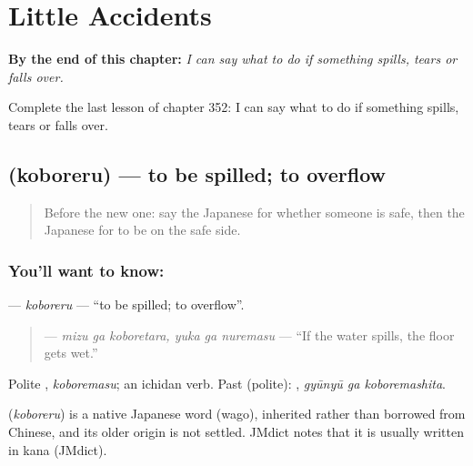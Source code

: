 
\chapter{Little Accidents}
\label{ch:ja-little-accidents}

\begin{chapteropening}
\textbf{By the end of this chapter:} \emph{I can say what to do if something spills, tears or falls over.}

Complete the last lesson of chapter 352: I can say what to do if something spills, tears or falls over.
\end{chapteropening}

\section[\texorpdfstring{\ja{こぼれる} (koboreru)}{こぼれる (koboreru)}]{ (koboreru) — to be spilled; to overflow}

\label{lesson:JA-C352-koboreru}



\begin{quote}
Before the new one: say the Japanese for whether someone is safe, then the Japanese for to be on the safe side.
\end{quote}

\subsection*{You'll want to know: }
\textbf{} — \emph{koboreru} — \textquotedblleft{}to be spilled; to overflow\textquotedblright{}.

\begin{quote}
\textbf{  } — \emph{mizu ga koboretara, yuka ga nuremasu} — \textquotedblleft{}If the water spills, the floor gets wet.\textquotedblright{}
\end{quote}

Polite \textbf{}, \emph{koboremasu}; an ichidan verb. Past (polite): \textbf{ }, \emph{gyūnyū ga koboremashita}.

\begin{cousinweb}
\textbf{} (\emph{koboreru}) is a native Japanese word (wago), inherited rather than borrowed from Chinese, and its older origin is not settled. JMdict notes that it is usually written in kana (JMdict).
\end{cousinweb}

